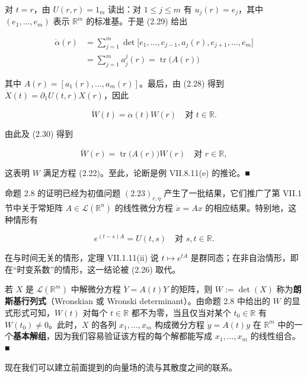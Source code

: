 \begin{proposition}
对 $ t = r $，由 $ U(r,r) = 1_m $ 读出：对 $ 1 \le j \le m $ 有 $ u_j(r) = e_j $，其中 $ (e_1,\ldots,e_m) $ 表示 $ \mathbb{R}^m $ 的标准基。于是 (2.29) 给出

\begin{equation}
\begin{aligned}
\dot{\alpha}(r) &= \sum_{j=1}^{m}\det\big[e_1,\ldots,e_{j-1},a_j(r),e_{j+1},\ldots,e_m\big] \\ &= \sum_{j=1}^{m}a_j^j(r) = \operatorname{tr}\big(A(r)\big)
\end{aligned}\tag{2.30}
\end{equation}

其中 $ A(r) = [a_1(r),\ldots,a_m(r)] $。最后，由 (2.28) 得到 $ \dot{X}(t) = \partial_1U(t,r)X(r) $，因此

\[
\dot{W}(t) = \dot{\alpha}(t)W(r) \quad \text{对 } t \in \mathbb{R} .
\]

由此及 (2.30) 得到

\[
\dot{W}(r) = \operatorname{tr}\big(A(r)\big)W(r) \quad \text{对 } r \in \mathbb{R} ,
\]

这表明 $ W $ 满足方程 (2.22)。至此，论断是例 VII.8.11(e) 的推论。\nobreak\hspace{0.35em}■

\end{proposition}

\begin{remark}

\begin{items}
\item

命题 2.8 的证明已经为初值问题 $ (2.23)_{r,\eta} $ 产生了一批结果，它们推广了第 VII.1 节中关于常矩阵 $ A \in \mathcal{L}(\mathbb{R}^n) $ 的线性微分方程 $ \dot{x} = Ax $ 的相应结果。特别地，这种情形有

\[
e^{(t-s)A} = U(t,s) \quad \text{对 } s,t \in \mathbb{R} .
\]

在与时间无关的情形，定理 VII.1.11(ii) 说 $ t \mapsto e^{tA} $ 是群同态；在非自治情形，即在“时变系数”的情形，这一结论被 (2.26) 取代。

\item

若 $ X $ 是 $ \mathcal{L}(\mathbb{R}^m) $ 中解微分方程 $ \dot{Y} = A(t)Y $ 的矩阵，则 $ W := \det(X) $ 称为\textbf{朗斯基行列式}（Wronskian 或 Wronski determinant）。由命题 2.8 中给出的 $ W $ 的显式形式可知，$ W(t) $ 对每个 $ t \in \mathbb{R} $ 都不为零，当且仅当对某个 $ t_0 \in \mathbb{R} $ 有 $ W(t_0) \ne 0 $。此时，$ X $ 的各列 $ x_1,\ldots,x_m $ 构成微分方程 $ \dot{y} = A(t)y $ 在 $ \mathbb{R}^m $ 中的一个\textbf{基本解组}，因为我们容易验证该方程的每个解都能写成 $ x_1,\ldots,x_m $ 的线性组合。\nobreak\hspace{0.35em}■

\end{items}

现在我们可以建立前面提到的向量场的流与其散度之间的联系。

\end{remark}

